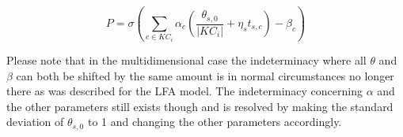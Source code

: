 \documentclass{scrartcl}
\begin{document}
\begin{equation}
\label{eq:sumeIRT}
P = \sigma(\sum_{c \in KC_{i}} \alpha_{c}(\frac{\theta_{s,0}}{|KC_{i}|} + \eta_{s} t_{s,c}) - \beta_{c})
\end{equation}

Please note that in the multidimensional case the indeterminacy where all $\theta$ and $\beta$ can both be shifted by the same amount is in normal circumstances no longer there as was described for the LFA model. The indeterminacy concerning $\alpha$ and the other parameters still exists though and is resolved by making the standard deviation of $\theta_{s,0}$ to 1 and changing the other parameters accordingly. 

\end{document}
